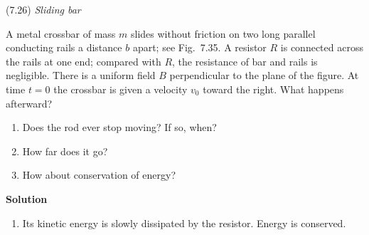 \documentclass{article}
\begin{document}
\begin{homeworkProblem}
	(7.26) \textit{Sliding bar}

	A metal crossbar of mass $m$ slides without friction on two long parallel conducting rails a distance $b$ apart; see Fig.~7.35. A resistor $R$ is connected across the rails at one end; compared with $R$, the resistance of bar and rails is negligible. There is a uniform field $B$ perpendicular to the plane of the figure. At time $t=0$ the crossbar is given a velocity $v_0$ toward the right. What happens afterward?
	\begin{enumerate}[label = (\alph*)]
		\item Does the rod ever stop moving? If so, when?
		\item How far does it go?
		\item How about conservation of energy?
	\end{enumerate}

	\textbf{Solution}
	\begin{enumerate}[label = (\alph*)]
		\begin{item}
			No. Because it could only stop when all its initial kinetic energy is dissipated by the resistor, but the slower it moves the slower its energy gets dissipated. $F=IbB$. Rate of change of area $dA/dt=vb$. So
			\[
				V=-\frac{d\Phi_B}{dt}=-B\frac{dA}{dt}=-Bvb
			\]
			So the current
			\[
				I=V/R=-Bvb/R
			\]
			So the force acting on the bar is
			\[
				F=-\frac{B^2b^2v}{R}
			\]
			therefore
			\[
				\frac{dv}{dt}=-\frac{B^2b^2v}{mR}
			\]
			rearrange
			\[
				\frac{dv}{v}=-\frac{B^2b^2\,dt}{mR}
			\]
			integrate and get
			\[
				\ln\left(\frac{v}{v_0}\right)=-\frac{B^2b^2t}{mR}
			\]
			So
			\[
				v=v_0 e^{-\frac{B^2b^2t}{mR}}
			\]
			Seemingly, the time it takes for the bar to reach $v=0$ is infinity.
		\end{item}
		\begin{item}
			Its initial kinetic energy is
			\[
				K=\frac{1}{2}m{v_0}^2
			\]
			the energy dissipated is
			\[
				W=\int F\,dx=K
			\]
			So
			\[
				\int_0^{x_f}\frac{B^2b^2\,dx}{R\,dt}\,dx=K
			\]
			Obviously $x$ will have $t$ in its result. Because $t$ goes to infinity, $x$ also is not bounded.
		\end{item}
		\item Its kinetic energy is slowly dissipated by the resistor. Energy is conserved.
	\end{enumerate}
\end{homeworkProblem}
\end{document}

